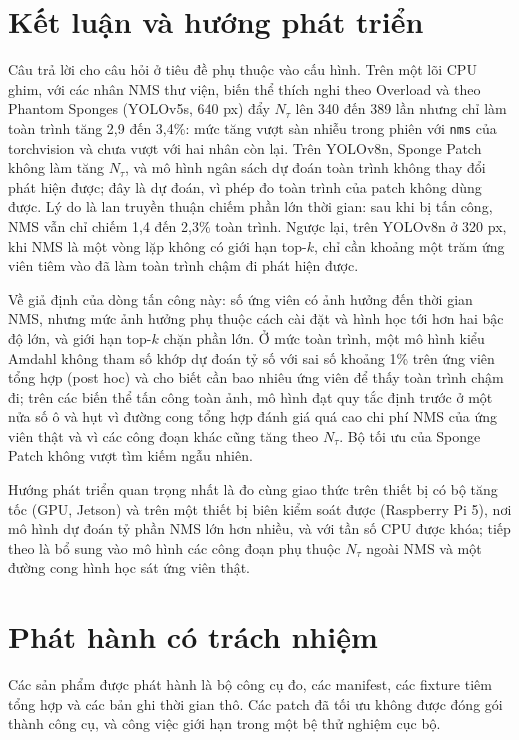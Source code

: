 \documentclass[a4paper,fleqn]{cas-dc}
\newcommand{\Ntau}{N_{\tau}}
\begin{document}
\section{Kết luận và hướng phát triển}
\label{sec:conclusion}
Câu trả lời cho câu hỏi ở tiêu đề phụ thuộc vào cấu hình. Trên một lõi CPU ghim, với các nhân NMS thư viện, biến thể thích nghi theo Overload và theo Phantom Sponges (YOLOv5s, 640 px) đẩy $\Ntau$ lên 340 đến 389 lần nhưng chỉ làm toàn trình tăng 2,9 đến 3,4\%: mức tăng vượt sàn nhiễu trong phiên với \texttt{nms} của torchvision và chưa vượt với hai nhân còn lại. Trên YOLOv8n, Sponge Patch không làm tăng $\Ntau$, và mô hình ngân sách dự đoán toàn trình không thay đổi phát hiện được; đây là dự đoán, vì phép đo toàn trình của patch không dùng được. Lý do là lan truyền thuận chiếm phần lớn thời gian: sau khi bị tấn công, NMS vẫn chỉ chiếm 1,4 đến 2,3\% toàn trình. Ngược lại, trên YOLOv8n ở 320 px, khi NMS là một vòng lặp không có giới hạn top-$k$, chỉ cần khoảng một trăm ứng viên tiêm vào đã làm toàn trình chậm đi phát hiện được.

Về giả định của dòng tấn công này: số ứng viên có ảnh hưởng đến thời gian NMS, nhưng mức ảnh hưởng phụ thuộc cách cài đặt và hình học tới hơn hai bậc độ lớn, và giới hạn top-$k$ chặn phần lớn. Ở mức toàn trình, một mô hình kiểu Amdahl không tham số khớp dự đoán tỷ số với sai số khoảng 1\% trên ứng viên tổng hợp (post hoc) và cho biết cần bao nhiêu ứng viên để thấy toàn trình chậm đi; trên các biến thể tấn công toàn ảnh, mô hình đạt quy tắc định trước ở một nửa số ô và hụt vì đường cong tổng hợp đánh giá quá cao chi phí NMS của ứng viên thật và vì các công đoạn khác cũng tăng theo $\Ntau$. Bộ tối ưu của Sponge Patch không vượt tìm kiếm ngẫu nhiên.

Hướng phát triển quan trọng nhất là đo cùng giao thức trên thiết bị có bộ tăng tốc (GPU, Jetson) và trên một thiết bị biên kiểm soát được (Raspberry Pi 5), nơi mô hình dự đoán tỷ phần NMS lớn hơn nhiều, và với tần số CPU được khóa; tiếp theo là bổ sung vào mô hình các công đoạn phụ thuộc $\Ntau$ ngoài NMS và một đường cong hình học sát ứng viên thật.

\FloatBarrier
\section*{Phát hành có trách nhiệm}
Các sản phẩm được phát hành là bộ công cụ đo, các manifest, các fixture tiêm tổng hợp và các bản ghi thời gian thô. Các patch đã tối ưu không được đóng gói thành công cụ, và công việc giới hạn trong một bệ thử nghiệm cục bộ.
\end{document}
